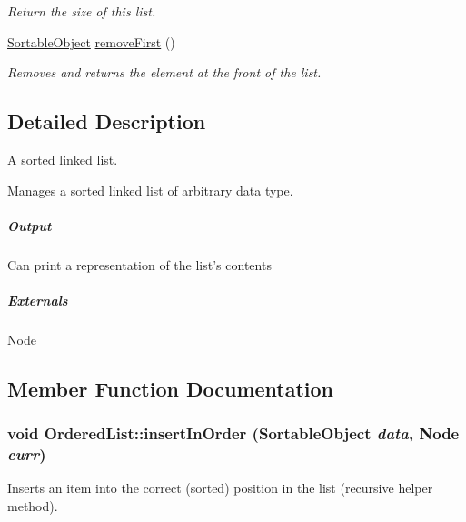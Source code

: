 \begin{CompactItemize}
\begin{CompactList}\small\item\em Return the size of this list. \item\end{CompactList}\item 
\hypertarget{class_ordered_list_a3941ce1a3f68a78408182cee76f4353}{
\hyperlink{class_sortable_object}{SortableObject} \hyperlink{class_ordered_list_a3941ce1a3f68a78408182cee76f4353}{removeFirst} ()}
\label{class_ordered_list_a3941ce1a3f68a78408182cee76f4353}

\begin{CompactList}\small\item\em Removes and returns the element at the front of the list. \item\end{CompactList}\end{CompactItemize}


\subsection{Detailed Description}
A sorted linked list. 

Manages a sorted linked list of arbitrary data type.

\subparagraph*{Output}

Can print a representation of the list's contents \subparagraph*{Externals}

\hyperlink{class_node}{Node} 

\subsection{Member Function Documentation}
\hypertarget{class_ordered_list_8d86cb6f2ce66b3565929493e055cc09}{
\subsubsection[{insertInOrder}]{\setlength{\rightskip}{0pt plus 5cm}void OrderedList::insertInOrder ({\bf SortableObject} {\em data}, \/  {\bf Node} {\em curr})}}
\label{class_ordered_list_8d86cb6f2ce66b3565929493e055cc09}


Inserts an item into the correct (sorted) position in the list (recursive helper method). 

